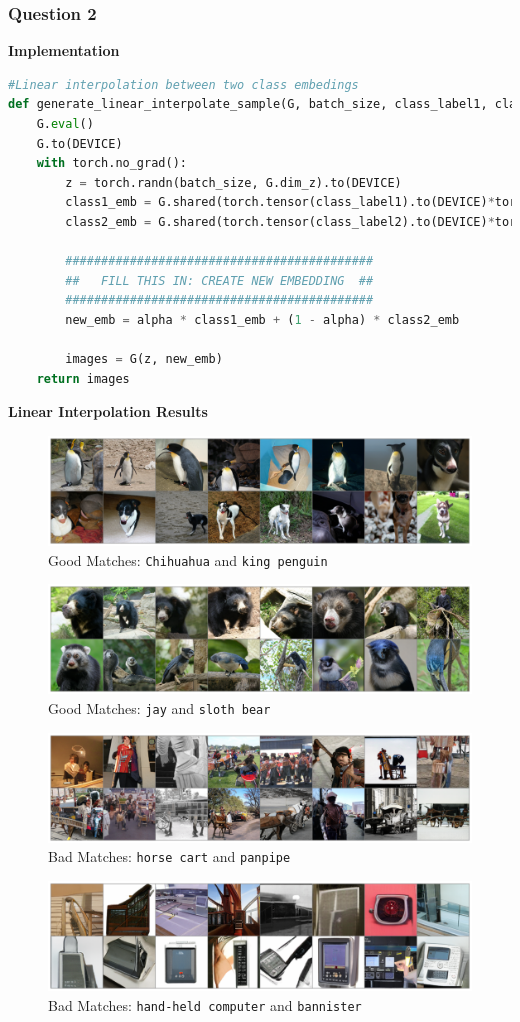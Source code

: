 \documentclass{article}
\begin{document}
	\subsubsection{Question 2}
	\textbf{Implementation}
	\begin{lstlisting}[language=python]
#Linear interpolation between two class embedings
def generate_linear_interpolate_sample(G, batch_size, class_label1, class_label2, alpha):
  	G.eval()
  	G.to(DEVICE)
  	with torch.no_grad():
	    z = torch.randn(batch_size, G.dim_z).to(DEVICE)
	    class1_emb = G.shared(torch.tensor(class_label1).to(DEVICE)*torch.ones((batch_size,)).to(DEVICE).long())
	    class2_emb = G.shared(torch.tensor(class_label2).to(DEVICE)*torch.ones((batch_size,)).to(DEVICE).long())
	
	    ###########################################
	    ##   FILL THIS IN: CREATE NEW EMBEDDING  ##
	    ###########################################    
	    new_emb = alpha * class1_emb + (1 - alpha) * class2_emb
	
	    images = G(z, new_emb)
  	return images
	\end{lstlisting}
	\textbf{Linear Interpolation Results}
	\begin{figure}[H]
		\caption{Good Matches: \texttt{Chihuahua} and \texttt{king penguin}}
		\centering
		\medbreak
		\includegraphics[width=0.7\linewidth]{./good1.png}
	\end{figure}

	\begin{figure}[H]
		\caption{Good Matches: \texttt{jay} and \texttt{sloth bear}}
		\centering
		\medbreak
		\includegraphics[width=0.7\linewidth]{./good2.png}
	\end{figure}
	
	\begin{figure}[H]
		\caption{Bad Matches: \texttt{horse cart} and \texttt{panpipe}}
		\centering
		\medbreak
		\includegraphics[width=0.7\linewidth]{./bad1.png}
	\end{figure}

	\begin{figure}[H]
		\caption{Bad Matches: \texttt{hand-held computer} and \texttt{bannister}}
		\centering
		\medbreak
		\includegraphics[width=0.7\linewidth]{./bad2.png}
	\end{figure}
\end{document}
